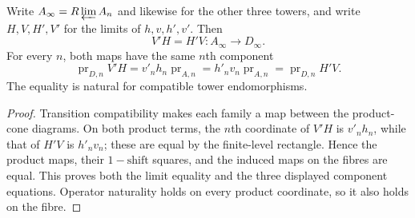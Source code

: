 \begin{lemma}
\label{lemma:weil-pbc-level-map-derived-limit}
Write $A_\infty=R\varprojlim A_n$ and likewise for the other three towers,
and write $H,V,H',V'$ for the limits of $h,v,h',v'$.  Then
\[
 V'H=H'V:A_\infty\longrightarrow D_\infty.
\]
For every $n$, both maps have the same $n$th component
\[
 \operatorname{pr}_{D,n}V'H
 =v'_nh_n\operatorname{pr}_{A,n}
 =h'_nv_n\operatorname{pr}_{A,n}
 =\operatorname{pr}_{D,n}H'V.
\]
The equality is natural for compatible tower endomorphisms.
\end{lemma}
\begin{proof}

Transition compatibility makes each family a map between the product-cone
diagrams.  On both product terms, the $n$th coordinate of $V'H$ is
$v'_nh_n$, while that of $H'V$ is $h'_nv_n$; these are equal by the
finite-level rectangle.  Hence the product maps, their $1-\mathrm{shift}$
squares, and the induced maps on the fibres are equal.  This proves both the
limit equality and the three displayed component equations.  Operator
naturality holds on every product coordinate, so it also holds on the fibre.
\end{proof}

